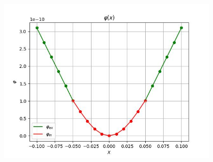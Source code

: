 \documentclass[a4paper,12pt]{article}
\begin{document}
\begin{figure}[h!]
		\begin{minipage}[h]{0.55\linewidth}
			\includegraphics[width=1\linewidth]{Prt sc/Figure_3.jpeg}
		\end{minipage}

	\end{figure}
\end{document}
